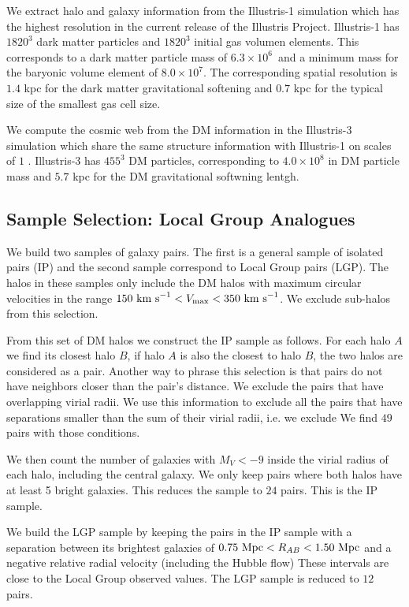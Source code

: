 \documentclass[useAMS,usenatbib,usegraphicx]{mn2e}
\newcommand{\Mpc}{{\ifmmode{{\rm Mpc}}\else{Mpc}\fi}}
\newcommand{\Msun}{{\ifmmode{{\rm{M_{\odot}}}}\else{${\rm{M_{\odot}}}$}\fi}}
\newcommand{\kms}{{\ifmmode{{\rm{km\ s}^{-1}}}\else{km $\rm{s}^{-1}$}\fi}}
\begin{document}
We extract halo and galaxy information from the Illustris-1 simulation
which has the highest resolution in the current release of the
Illustris Project.
Illustris-1 has $1820^3$ dark matter particles and $1820^3$ initial gas
volumen elements. 
This corresponds to a dark matter particle mass of
$6.3\times 10^6$\Msun\ and a minimum mass for the baryonic volume
element of $8.0\times 10^7$\Msun. 
The corresponding spatial resolution is $1.4$ kpc for the dark matter
gravitational softening and $0.7$ kpc for the typical size of the
smallest gas cell size. 

We compute the cosmic web from the DM information in the
Illustris-3 simulation which share the same structure information with
Illustris-1 on scales of $1$ \Mpc.  
Illustris-3 has $455^3$ DM particles, corresponding to
$4.0\times 10^8$ \Msun in DM particle mass and $5.7$ kpc for the DM
gravitational softwning lentgh.
 

\subsection{Sample Selection: Local Group Analogues}

We build two samples of galaxy pairs. 
The first is a general sample of isolated pairs (IP) and the
second sample correspond to Local Group pairs (LGP).
The halos in these samples only include the DM halos with maximum
circular velocities in the range $ 150\ \kms <V_{\rm max}< 350\ \kms$. We
exclude sub-halos from this selection. 

From this set of DM halos we construct the IP sample as follows.
For each halo $A$ we find its closest halo $B$, if halo $A$ is also
the closest to halo $B$, the two halos are considered as a pair. 
Another way to phrase this selection is that pairs do not have
neighbors closer than the pair's distance.
We exclude the pairs that have overlapping virial radii. 
We use this information to exclude all the pairs that have separations
smaller than the sum of their virial radii, i.e. we exclude
We find $49$ pairs with those conditions.

We then count the number of galaxies with $M_V<-9$ inside the virial
radius of each halo, including the central galaxy.
We only keep pairs where both halos have at least 5 bright galaxies. 
This reduces the sample to $24$ pairs.  
This is the IP sample.

We build the LGP sample by keeping the pairs in the IP sample with
a separation between its brightest galaxies of $0.75\ \Mpc <R_{AB}< 1.50\ \Mpc$
and a negative relative radial velocity (including the Hubble flow) 
These intervals are close to the Local Group observed values.
The LGP sample is reduced to $12$ pairs.
\end{document}
